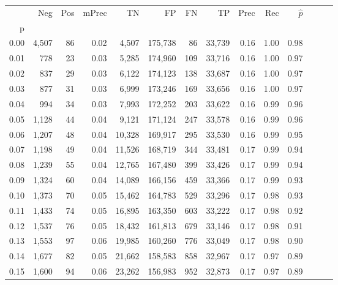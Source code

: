 \begin{tabular}{rrrrrrrrrrrrrr}
\toprule
{} &    Neg &    Pos & mPrec &       TN &       FP &      FN &      TP &  Prec &   Rec & $\hat{p}$ \\
p    &        &        &       &          &          &         &         &       &       &           \\
\midrule
0.00 &  4,507 &     86 &  0.02 &    4,507 &  175,738 &      86 &  33,739 &  0.16 &  1.00 &      0.98 \\
0.01 &    778 &     23 &  0.03 &    5,285 &  174,960 &     109 &  33,716 &  0.16 &  1.00 &      0.97 \\
0.02 &    837 &     29 &  0.03 &    6,122 &  174,123 &     138 &  33,687 &  0.16 &  1.00 &      0.97 \\
0.03 &    877 &     31 &  0.03 &    6,999 &  173,246 &     169 &  33,656 &  0.16 &  1.00 &      0.97 \\
0.04 &    994 &     34 &  0.03 &    7,993 &  172,252 &     203 &  33,622 &  0.16 &  0.99 &      0.96 \\
0.05 &  1,128 &     44 &  0.04 &    9,121 &  171,124 &     247 &  33,578 &  0.16 &  0.99 &      0.96 \\
0.06 &  1,207 &     48 &  0.04 &   10,328 &  169,917 &     295 &  33,530 &  0.16 &  0.99 &      0.95 \\
0.07 &  1,198 &     49 &  0.04 &   11,526 &  168,719 &     344 &  33,481 &  0.17 &  0.99 &      0.94 \\
0.08 &  1,239 &     55 &  0.04 &   12,765 &  167,480 &     399 &  33,426 &  0.17 &  0.99 &      0.94 \\
0.09 &  1,324 &     60 &  0.04 &   14,089 &  166,156 &     459 &  33,366 &  0.17 &  0.99 &      0.93 \\
0.10 &  1,373 &     70 &  0.05 &   15,462 &  164,783 &     529 &  33,296 &  0.17 &  0.98 &      0.93 \\
0.11 &  1,433 &     74 &  0.05 &   16,895 &  163,350 &     603 &  33,222 &  0.17 &  0.98 &      0.92 \\
0.12 &  1,537 &     76 &  0.05 &   18,432 &  161,813 &     679 &  33,146 &  0.17 &  0.98 &      0.91 \\
0.13 &  1,553 &     97 &  0.06 &   19,985 &  160,260 &     776 &  33,049 &  0.17 &  0.98 &      0.90 \\
0.14 &  1,677 &     82 &  0.05 &   21,662 &  158,583 &     858 &  32,967 &  0.17 &  0.97 &      0.89 \\
0.15 &  1,600 &     94 &  0.06 &   23,262 &  156,983 &     952 &  32,873 &  0.17 &  0.97 &      0.89 \\

\end{tabular}
